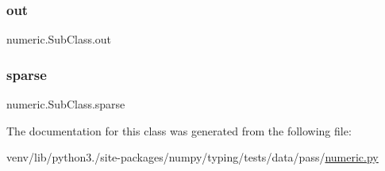 \mbox{\label{classnumeric_1_1SubClass_a72faef303b82a697ddb7a5f6239a0931}} 
\subsubsection{\texorpdfstring{out}{out}}
{\footnotesize\ttfamily numeric.\+Sub\+Class.\+out\hspace{0.3cm}{\ttfamily [static]}}

\mbox{\label{classnumeric_1_1SubClass_a015b8a308007b01c9bcb3a4e6d47877f}} 
\subsubsection{\texorpdfstring{sparse}{sparse}}
{\footnotesize\ttfamily numeric.\+Sub\+Class.\+sparse\hspace{0.3cm}{\ttfamily [static]}}



The documentation for this class was generated from the following file\+:\begin{DoxyCompactItemize}
\item 
venv/lib/python3./site-\/packages/numpy/typing/tests/data/pass/\hyperlink{typing_2tests_2data_2pass_2numeric_8py}{numeric.\+py}\end{DoxyCompactItemize}
